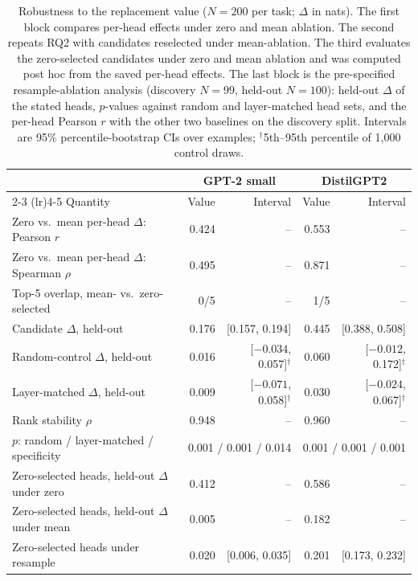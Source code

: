 \documentclass{article}
\begin{document}
\begin{table}[t]
  \caption{Robustness to the replacement value ($N=200$ per task; $\Delta$
  in nats). The first block compares per-head effects under zero and mean
  ablation. The second repeats RQ2 with candidates reselected under
  mean-ablation. The third evaluates the zero-selected candidates under
  zero and mean ablation and was computed post hoc from the saved per-head
  effects. The last block is the pre-specified resample-ablation analysis
  (discovery $N=99$, held-out $N=100$): held-out $\Delta$ of the stated
  heads, $p$-values against random and layer-matched head sets, and the
  per-head Pearson $r$ with the other two baselines on the discovery split. Intervals are 95\% percentile-bootstrap CIs over examples;
  $^\dagger$5th--95th percentile of 1{,}000 control draws.}
  \label{tab:mean}
  \centering
  \small
  \setlength{\tabcolsep}{4pt}
  \begin{tabular}{lrrrr}
    \toprule
    & \multicolumn{2}{c}{GPT-2 small} & \multicolumn{2}{c}{DistilGPT2} \\
    \cmidrule(lr){2-3} \cmidrule(lr){4-5}
    Quantity & Value & Interval & Value & Interval \\
    \midrule
    Zero vs.\ mean per-head $\Delta$: Pearson $r$ & 0.424 & -- & 0.553 & -- \\
    Zero vs.\ mean per-head $\Delta$: Spearman $\rho$ & 0.495 & -- & 0.871 & -- \\
    Top-5 overlap, mean- vs.\ zero-selected & 0/5 & -- & 1/5 & -- \\
    \midrule
    Candidate $\Delta$, held-out & 0.176 & [0.157, 0.194] & 0.445 & [0.388, 0.508] \\
    Random-control $\Delta$, held-out & 0.016 & [$-0.034$, 0.057]$^\dagger$ & 0.060 & [$-0.012$, 0.172]$^\dagger$ \\
    Layer-matched $\Delta$, held-out & 0.009 & [$-0.071$, 0.058]$^\dagger$ & 0.030 & [$-0.024$, 0.067]$^\dagger$ \\
    Rank stability $\rho$ & 0.948 & -- & 0.960 & -- \\
    $p$: random / layer-matched / specificity & \multicolumn{2}{r}{0.001 / 0.001 / 0.014} & \multicolumn{2}{r}{0.001 / 0.001 / 0.001} \\
    \midrule
    Zero-selected heads, held-out $\Delta$ under zero & 0.412 & -- & 0.586 & -- \\
    Zero-selected heads, held-out $\Delta$ under mean & 0.005 & -- & 0.182 & -- \\
    \midrule
    Zero-selected heads under resample & 0.020 & [0.006, 0.035] & 0.201 & [0.173, 0.232] \\

\end{tabular}
\end{table}
\end{document}
